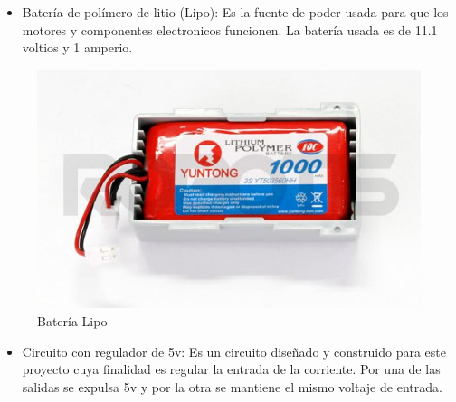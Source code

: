 \begin{itemize}
\item Batería de polímero de litio (Lipo): Es la fuente de poder usada para que los motores y componentes electronicos
funcionen. La batería usada es de 11.1 voltios y 1 amperio. \cite{bateria}
\end{itemize}


\begin{figure}[hbtp]
\centering
\includegraphics[scale=0.5]{imagenes/R-LIPOBAT.jpg}
\caption{Batería Lipo}
\end{figure}

\begin{itemize}
\item Circuito con regulador de 5v: Es un circuito diseñado y construido para este proyecto cuya finalidad es regular la 
entrada de la corriente. Por una de las salidas se expulsa 5v y por la otra se mantiene el mismo voltaje de entrada. 
\end{itemize}




